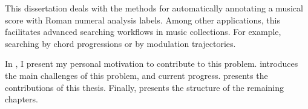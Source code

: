 

This dissertation deals with the methods for automatically
annotating a musical score with Roman numeral analysis
labels. Among other applications, this facilitates advanced
searching workflows in music collections. For example,
searching by chord progressions or by modulation
trajectories.

In , I present my personal motivation to
contribute to this problem.  introduces
the main challenges of this problem, and current progress.
 presents the
contributions of this thesis. Finally,
 presents the structure of the
remaining chapters.
